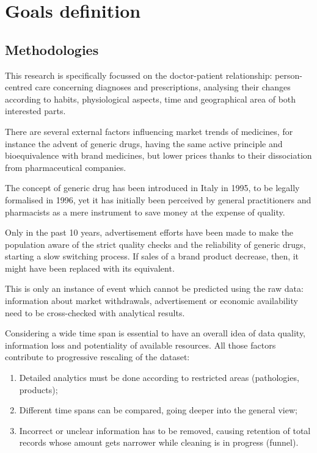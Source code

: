 \chapter{Goals definition} 
\section{Methodologies}
This research is specifically focussed on the doctor-patient relationship: person-centred care concerning diagnoses and prescriptions, analysing their changes according to habits, physiological aspects, time and geographical area of both interested parts. 

There are several external factors influencing market trends of medicines, for instance the advent of generic drugs, having the same active principle and bioequivalence with brand medicines, but lower prices thanks to their dissociation from pharmaceutical companies.

The concept of generic drug has been introduced in Italy in 1995, to be legally formalised in 1996\cite{generico}, yet it has initially been perceived by general practitioners and pharmacists as a mere instrument to save money at the expense of quality\cite{medicinaliequivalenti}.

Only in the past 10 years, advertisement efforts have been made to make the population aware of the strict quality checks and the reliability of generic drugs, starting a slow switching process. If sales of a brand product decrease, then, it might have been replaced with its equivalent.

This is only an instance of event which cannot be predicted using the raw data: information about market withdrawals, advertisement or economic availability need to be cross-checked with analytical results.

Considering a wide time span is essential to have an overall idea of data quality, information loss and potentiality of available resources. All those factors contribute to progressive rescaling of the dataset:
\begin{enumerate}
	\item Detailed analytics must be done according to restricted areas (pathologies, products);
	\item Different time spans can be compared, going deeper into the general view;
	\item Incorrect or unclear information has to be removed, causing retention of total records whose amount gets narrower while cleaning is in progress (funnel).
\end{enumerate}

